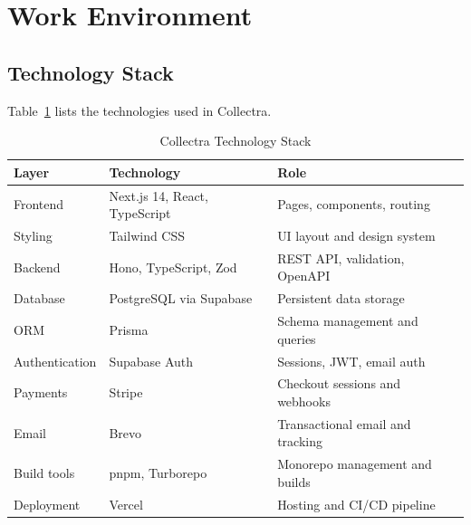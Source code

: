 \documentclass[12pt,a4paper]{report}
\begin{document}
\section{Work Environment}

\subsection{Technology Stack}

Table~\ref{tab:techstack} lists the technologies used in Collectra.

\begin{table}[H]
  \centering
  \renewcommand{\arraystretch}{1.3}
  \begin{tabular}{|p{3.4cm}|p{4.6cm}|p{5.2cm}|}
    \hline
    \textbf{Layer}      & \textbf{Technology}              & \textbf{Role} \\
    \hline
    Frontend            & Next.js 14, React, TypeScript     & Pages, components, routing \\
    \hline
    Styling             & Tailwind CSS                     & UI layout and design system \\
    \hline
    Backend             & Hono, TypeScript, Zod            & REST API, validation, OpenAPI \\
    \hline
    Database            & PostgreSQL via Supabase          & Persistent data storage \\
    \hline
    ORM                 & Prisma                           & Schema management and queries \\
    \hline
    Authentication      & Supabase Auth                    & Sessions, JWT, email auth \\
    \hline
    Payments            & Stripe                           & Checkout sessions and webhooks \\
    \hline
    Email               & Brevo                            & Transactional email and tracking \\
    \hline
    Build tools         & pnpm, Turborepo                  & Monorepo management and builds \\
    \hline
    Deployment          & Vercel                           & Hosting and CI/CD pipeline \\
    \hline
  \end{tabular}
  \caption{Collectra Technology Stack}
  \label{tab:techstack}
\end{table}
\end{document}
